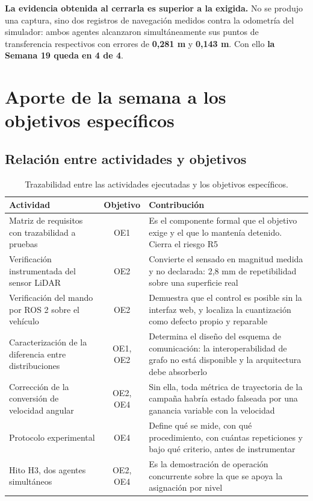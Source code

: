 \documentclass[12pt,letterpaper]{article}
\begin{document}
\textbf{La evidencia obtenida al cerrarla es superior a la exigida.} No se produjo una captura, sino dos registros de navegación medidos contra la odometría del simulador: ambos agentes alcanzaron simultáneamente sus puntos de transferencia respectivos con errores de \textbf{0,281 m} y \textbf{0,143 m}. Con ello \textbf{la Semana 19 queda en 4 de 4}.

\section{Aporte de la semana a los objetivos específicos}
\label{sec:aporte}

\subsection{Relación entre actividades y objetivos}

\begin{table}[H]
    \centering
    \small
    \caption{Trazabilidad entre las actividades ejecutadas y los objetivos específicos.}
    \label{tab:trazabilidad}
    \begin{tabular}{@{}p{4.0cm}cp{7.6cm}@{}}
        \toprule
        \textbf{Actividad} & \textbf{Objetivo} & \textbf{Contribución} \\ \midrule
        Matriz de requisitos con trazabilidad a pruebas & OE1 & Es el componente formal que el objetivo exige y el que lo mantenía detenido. Cierra el riesgo R5 \\ \addlinespace
        Verificación instrumentada del sensor LiDAR & OE2 & Convierte el sensado en magnitud medida y no declarada: 2,8 mm de repetibilidad sobre una superficie real \\ \addlinespace
        Verificación del mando por ROS 2 sobre el vehículo & OE2 & Demuestra que el control es posible sin la interfaz web, y localiza la cuantización como defecto propio y reparable \\ \addlinespace
        Caracterización de la diferencia entre distribuciones & OE1, OE2 & Determina el diseño del esquema de comunicación: la interoperabilidad de grafo no está disponible y la arquitectura debe absorberlo \\ \addlinespace
        Corrección de la conversión de velocidad angular & OE2, OE4 & Sin ella, toda métrica de trayectoria de la campaña habría estado falseada por una ganancia variable con la velocidad \\ \addlinespace
        Protocolo experimental & OE4 & Define qué se mide, con qué procedimiento, con cuántas repeticiones y bajo qué criterio, antes de instrumentar \\ \addlinespace
        Hito H3, dos agentes simultáneos & OE2, OE4 & Es la demostración de operación concurrente sobre la que se apoya la asignación por nivel \\ \bottomrule
    \end{tabular}
\end{table}
\end{document}
